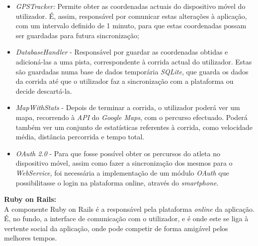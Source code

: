 \documentclass[15pt,a4paper]{article}
\begin{document}
\begin{itemize}
  \item \textit{GPSTracker:} Permite obter as coordenadas actuais do dispositivo móvel do utilizador. É, assim, responsável por comunicar estas alterações à aplicação, com um intervalo definido de 1 minuto, para que estas coordenadas possam ser guardadas para futura sincronização;

 \item \textit{DatabaseHandler} - Responsável por guardar as coordenadas obtidas e adicioná-las a uma pista, correspondente à corrida actual do utilizador. Estas são guardadas numa base de dados temporária  \textit{SQLite}, que guarda os dados da corrida até que o utilizador faz a sincronização com a plataforma ou decide descartá-la. 

 \item \textit{MapWithStats} - Depois de terminar a corrida, o utilizador poderá ver um mapa, recorrendo à  \textit{API }do \textit{Google Maps}, com o percurso efectuado. Poderá também ver um conjunto de estatísticas referentes à corrida, como velocidade média, distância percorrida e tempo total.

\item \textit {OAuth 2.0} - Para que fosse possível obter os percursos do atleta no dispositivo móvel, assim como fazer a sincronização dos mesmos para o \textit{WebService}, foi necessária a implementação de um módulo \textit{OAuth} que possibilitasse o login na plataforma online, através do \textit{smartphone}.
\\
\end{itemize}
 
\textbf{Ruby on Rails:}
\\

A componente Ruby on Rails é a responsável pela plataforma  \textit{online} da aplicação. É, no fundo, a interface de comunicação com o utilizador, e é onde este se liga à vertente social da aplicação, onde pode competir de forma amigável pelos melhores tempos. 
\end{document}
